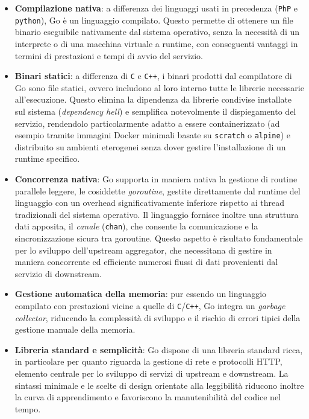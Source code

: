 \begin{itemize}
    \item \textbf{Compilazione nativa}: a differenza dei linguaggi usati in precedenza (\texttt{PhP} e \texttt{python}), Go è un linguaggio compilato. Questo permette di ottenere un file binario eseguibile nativamente dal sistema operativo, senza la necessità di un interprete o di una macchina virtuale a runtime, con conseguenti vantaggi in termini di prestazioni e tempi di avvio del servizio.
    
    \item \textbf{Binari statici}: a differenza di \texttt{C} e \texttt{C++}, i binari prodotti dal compilatore di Go sono file statici, ovvero includono al loro interno tutte le librerie necessarie all'esecuzione. Questo elimina la dipendenza da librerie condivise installate sul sistema (\emph{dependency hell}) e semplifica notevolmente il dispiegamento del servizio, rendendolo particolarmente adatto a essere containerizzato (ad esempio tramite immagini Docker minimali basate su \texttt{scratch} o \texttt{alpine}) e distribuito su ambienti eterogenei senza dover gestire l'installazione di un runtime specifico.
    
    \item \textbf{Concorrenza nativa}: Go supporta in maniera nativa la gestione di routine parallele leggere, le cosiddette \emph{goroutine}, gestite direttamente dal runtime del linguaggio con un overhead significativamente inferiore rispetto ai thread tradizionali del sistema operativo. Il linguaggio fornisce inoltre una struttura dati apposita, il \emph{canale} (\texttt{chan}), che consente la comunicazione e la sincronizzazione sicura tra goroutine. Questo aspetto è risultato fondamentale per lo sviluppo dell'upstream aggregator, che necessitana di gestire in maniera concorrente ed efficiente numerosi flussi di dati provenienti dal servizio di downstream.
    
    \item \textbf{Gestione automatica della memoria}: pur essendo un linguaggio compilato con prestazioni vicine a quelle di \texttt{C}/\texttt{C++}, Go integra un \emph{garbage collector}, riducendo la complessità di sviluppo e il rischio di errori tipici della gestione manuale della memoria.
    
    \item \textbf{Libreria standard e semplicità}: Go dispone di una libreria standard ricca, in particolare per quanto riguarda la gestione di rete e protocolli \ac{HTTP}, elemento centrale per lo sviluppo di servizi di upstream e downstream. La sintassi minimale e le scelte di design orientate alla leggibilità riducono inoltre la curva di apprendimento e favoriscono la manutenibilità del codice nel tempo.
\end{itemize}

